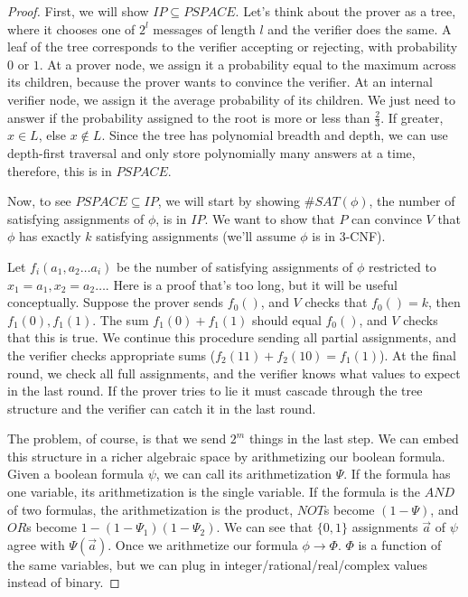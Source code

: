 \begin{proof}
	
	First, we will show $IP\subseteq PSPACE$.  Let's think about the prover as a tree, where it chooses one of $2^l$ messages of length $l$ and the verifier does the same.  A leaf of the tree corresponds to the verifier accepting or rejecting, with probability $0$ or $1$.  At a prover node, we assign it a probability equal to the maximum across its children, because the prover wants to convince the verifier.  At an internal verifier node, we assign it the average probability of its children.  We just need to answer if the probability assigned to the root is more or less than $\frac{2}{3}$.  If greater, $x\in L$, else $x\notin L$.  Since the tree has polynomial breadth and depth, we can use depth-first traversal and only store polynomially many answers at a time, therefore, this is in $PSPACE$.
	
	Now, to see $PSPACE\subseteq IP$, we will start by showing $\#SAT(\phi)$, the number of satisfying assignments of $\phi$, is in $IP$.  We want to show that $P$ can convince $V$ that $\phi$ has exactly $k$ satisfying assignments (we'll assume $\phi$ is in $3$-CNF).
	
	Let $f_i(a_1,a_2\dots a_i)$ be the number of satisfying assignments of $\phi$ restricted to $x_1=a_1,x_2=a_2\dots$.  Here is a proof that's too long, but it will be useful conceptually.  Suppose the prover sends $f_0()$, and $V$ checks that $f_0()=k$, then $f_1(0),f_1(1)$.  The sum  $f_1(0) +f_1(1)$ should equal $f_0()$, and $V$ checks that this is true.  We continue this procedure sending all partial assignments, and the verifier checks appropriate sums ($f_2(11)+f_2(10)=f_1(1)$).  At the final round, we check all full assignments, and the verifier knows what values to expect in the last round.  If the prover tries to lie it must cascade through the tree structure and the verifier can catch it in the last round.
	
	The problem, of course, is that we send $2^m$ things in the last step. We can embed this structure in a richer algebraic space by arithmetizing our boolean formula.  Given a boolean formula $\psi$, we can call its arithmetization $\Psi$.  If the formula has one variable, its arithmetization is the single variable.  If the formula is the $AND$ of two formulas, the arithmetization is the product, $NOT$s become $(1-\Psi)$, and $OR$s become $1-(1-\Psi_1)(1-\Psi_2)$.  We can see that $\{0,1\}$ assignments $\vec{a}$ of $\psi$ agree with $\Psi(\vec{a})$.  Once we arithmetize our formula $\phi \rightarrow \Phi$.  $\Phi$ is a function of the same variables, but we can plug in integer/rational/real/complex values instead of binary.
	

\end{proof}

